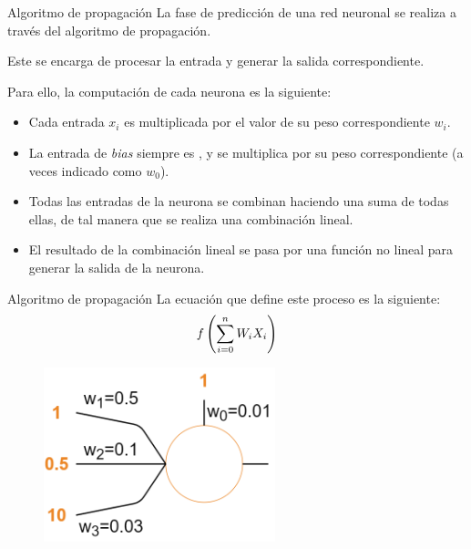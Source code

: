 \begin{frame}{Algoritmo de propagación}
La fase de \alert{predicción} de una red neuronal se realiza a través del algoritmo de \alert{propagación}.

Este se encarga de procesar la \alert{entrada} y generar la \alert{salida} correspondiente.

Para ello, la computación de cada \alert{neurona} es la siguiente:
\begin{itemize}
    \item Cada entrada $x_{i}$ es \alert{multiplicada} por el valor de su peso correspondiente $w_{i}$.
    \item La entrada de \textit{bias} \alert{siempre} es , y se multiplica por su peso correspondiente (a veces indicado como $w_{0}$).
    \item Todas las \alert{entradas} de la neurona se combinan haciendo una \alert{suma} de todas ellas, de tal manera que se realiza una \alert{combinación lineal}.
    \item El resultado de la combinación lineal se pasa por una \alert{función no lineal} para generar la \alert{salida} de la neurona.
\end{itemize}
\end{frame}

\begin{frame}{Algoritmo de propagación}
La ecuación que define este \alert{proceso} es la siguiente:
\setcounter{equation}{0}
\begin{equation}
    \Large f\left(\sum_{i=0}^{n} W_{i} X_{i}\right)
\end{equation}

\begin{figure}
\centering
    \includegraphics[width=0.6\textwidth]{figures/Tema 3/PropagationExample_1.png}
\end{figure}
\end{frame}

